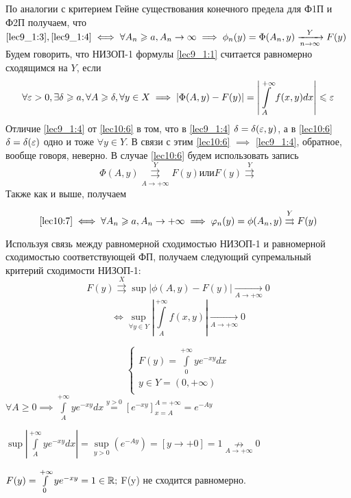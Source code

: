 \documentclass[../../main.tex]{subfiles}
\begin{document}
По аналогии с критерием Гейне существования конечного предела для Ф1П и Ф2П 
получаем, что 
$\eqref{lec9_1:3}, \eqref{lec9_1:4} \iff \forall A_n \ge 
a, A_n \to \infty \implies \phi_n(y) =\Phi(A_n,y) \xrightarrow[n\rightarrow 
\infty]{Y}F(y) $
Будем говорить, что НИЗОП-1 формулы \eqref{lec9_1:1}  считается 
равномерно сходящимся на $Y$, если
\begin{equation}
\label{lec10:6}
\forall \eps > 0, \exists \delta \ge a, \forall A \ge \delta, \forall y\in X 
\implies \left| \Phi(A,y) - F(y) \right| = \left| \int\limits_A^{+\infty} 
f(x,y) dx \right| \le \eps
\end{equation}
Отличие \eqref{lec9_1:4} от \eqref{lec10:6} в том, что в \eqref{lec9_1:4} 
$\delta = 
\delta(\eps,y)$, а в \eqref{lec10:6} $\delta = \delta(\eps)$ одно и тоже 
$\forall y \in Y$. В связи с этим \eqref{lec10:6} $\implies$ \eqref{lec9_1:4}, 
обратное, вообще говоря, неверно. 
В случае \eqref{lec10:6} будем использовать запись \begin{equation}
\label{lec10:7}
\Phi(A,y)\overset{Y}{\underset{A \to +\infty}{\rightrightarrows}}F(y) или 
F(y)\overset{Y}{\rightrightarrows}
\end{equation}
Также как и выше, получаем 

\begin{thm}
\begin{equation}
\label{lec10:8}
 \eqref{lec10:7} \iff \forall A_n \ge a, A_n\rightarrow +\infty \implies 
 \varphi_n(y) = \phi(A_n,y) \overset{Y}\rightrightarrows F(y) 
\end{equation}
\end{thm}
Используя связь между равномерной сходимостью НИЗОП-1 и равномерной 
сходимостью соответствующей ФП, получаем следующий супремальный критерий 
сходимости НИЗОП-1:
\begin{equation}
\label{lec10:9}
F(y)\overset{X} \rightrightarrows \sup\left|\phi(A , y) - F(y) \right| 
\underset{A \to + \infty}\to 0 \end{equation}
\begin{equation}
\label{lec10:10}\iff \underset{\forall y \in 
Y}\sup\left|\int\limits_A^{+\infty} f(x,y)\right| \underset{A \to + \infty} 
\to 0  \end{equation}

\begin{exmp}
\[ \left\{\begin{array}{rcl}
		F(y)=\int\limits_0^{+\infty}ye^{-xy}dx\\
		y \in Y = (0,+\infty)\\
		\end{array}
		\right. \]
$\forall A \ge 0 \implies \int\limits_A^{+\infty}ye^{-xy}dx \overset{y > 0} = 
\left[e^{-xy} \right]_{x = A}^{A = +\infty} = e^{-Ay} $

$\sup\left| \int\limits_A^{+\infty}ye^{-xy}dx \right|=\underset{y > 0}\sup  
\left( e^{-Ay}\right) = \left[y \to +0\right] = 1 \underset{A \to 
+\infty}\nrightarrow 0 $	

$F(y) = \int\limits_0^{+\infty}ye^{-xy} = 1 \in \R;$ F(y) не сходится 
равномерно.
\end{exmp}
\end{document}
